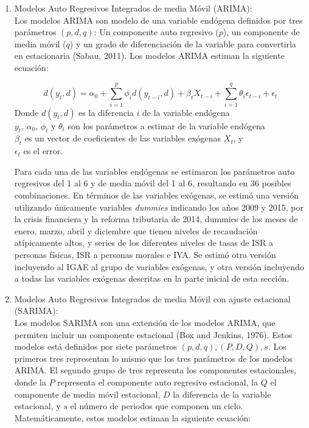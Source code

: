 \documentclass[a4paper, 11pt]{article}
\begin{document}
\begin{enumerate}
\item Modelos Auto Regresivos Integrados de media Móvil (ARIMA):\\

Los modelos ARIMA son modelo de una variable endógena definidos por tres parámetros $(p, d, q)$: Un componente auto regresivo ($p$), un componente de media móvil ($q$) y un grado de diferenciación de la variable para convertirla en estacionaria (Sabau, 2011). Los modelos ARIMA estiman la siguiente ecuación:

\begin{equation}
d(y_{t}, d) = \alpha_{0} + \sum_{i = 1}^{p}{\phi_{i}d(y_{t-i}, d) + \beta_{t}X_{t-i}} + \sum_{i = 1}^{q}{\theta_{i}\epsilon_{t-i}} + \epsilon_{t}
\end{equation}
Donde $d(y_{t}, d)$ es la diferencia $i$ de la variable endógena\\
$y_{t}$, $\alpha_{0}$, $\phi_{i}$ y $\theta_{i}$ son los parámetros a estimar de la variable endógena\\
$\beta_{t}$ es un vector de coeficientes de las variables exógenas $X_{t}$, y \\
$\epsilon_{t}$ es el error.

Para cada una de las variables endógenas se estimaron los parámetros auto regresivos del 1 al 6 y de media móvil del 1 al 6, resultando en 36 posibles combinaciones. En términos de las variables exógenas, se estimó una versión utilizando únicamente variables \textit{dummies} indicando los años 2009 y 2015, por la crisis financiera y la reforma tributaria de 2014, dummies de los meses de enero, marzo, abril y diciembre que tienen niveles de recaudación atípicamente altos, y series de los diferentes niveles de tasas de ISR a personas físicas, ISR a personas morales e IVA. Se estimó otra versión incluyendo al IGAE al grupo de variables exógenas, y otra versión incluyendo a todas las variables exógenas descritas en la parte inicial de esta sección.

\item Modelos Auto Regresivos Integrados de media Móvil con ajuste estacional (SARIMA):\\

Los modelos SARIMA son una extensión de los modelos ARIMA, que permiten incluir un componente estacional (Box and Jenkins, 1976). Estos modelos está definidos por siete parámetros $(p, d, q), (P, D, Q), s$. Los primeros tres representan lo mismo que los tres parámetros de los modelos ARIMA. El segundo grupo de tres representa los componentes estacionales, donde la $P$ representa el componente auto regresivo estacional, la $Q$ el componente de media móvil estacional, $D$ la diferencia de la variable estacional, y $s$ el número de periodos que componen un ciclo. Matemáticamente, estos modelos estiman la siguiente ecuación:


\end{enumerate}
\end{document}
